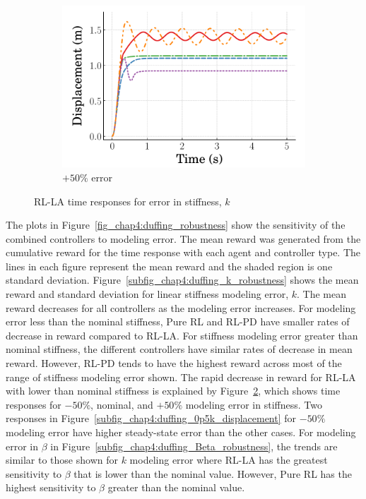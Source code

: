 \begin{figure}[tb]
\begin{subfigure}[b]{0.32\textwidth}
        \includegraphics[width=\textwidth]{figures/figures_robustness/duffing_robustness/time_responses/1p5k_displacement.pdf}
        \caption{$+50\%$ error}
        \label{subfig_chap4:duffing_1p5k_displacement}
    \end{subfigure}
    \caption{RL-LA time responses for error in stiffness, $k$}
    \label{fig_chap4:duffing_k_error_responses}
  \end{figure}
The plots in Figure~\ref{fig_chap4:duffing_robustness} show the sensitivity of the combined controllers to modeling error.
The mean reward was generated from the cumulative reward for the time response with each agent and controller type. The lines in each figure represent the mean reward and the shaded region is one standard deviation. 
%
Figure~\ref{subfig_chap4:duffing_k_robustness} shows the mean reward and standard deviation for linear stiffness modeling error, $k$. The mean reward decreases for all controllers as the modeling error increases. For modeling error less than the nominal stiffness, Pure RL and RL-PD have smaller rates of decrease in reward compared to RL-LA.
%
For stiffness modeling error greater than nominal stiffness, the different controllers have similar rates of decrease in mean reward. However, RL-PD tends to have the highest reward across most of the range of stiffness modeling error shown.
%
The rapid decrease in reward for RL-LA with lower than nominal stiffness is explained by Figure~\ref{fig_chap4:duffing_k_error_responses}, which shows time responses for $-50\%$, nominal, and $+50\%$ modeling error in stiffness. Two responses in Figure~\ref{subfig_chap4:duffing_0p5k_displacement} for $-50\%$ modeling error have higher steady-state error than the other cases.
%
For modeling error in $\beta$ in Figure~\ref{subfig_chap4:duffing_Beta_robustness}, the trends are similar to those shown for $k$ modeling error where RL-LA has the greatest sensitivity to $\beta$ that is lower than the nominal value. However, Pure RL has the highest sensitivity to $\beta$ greater than the nominal value.
